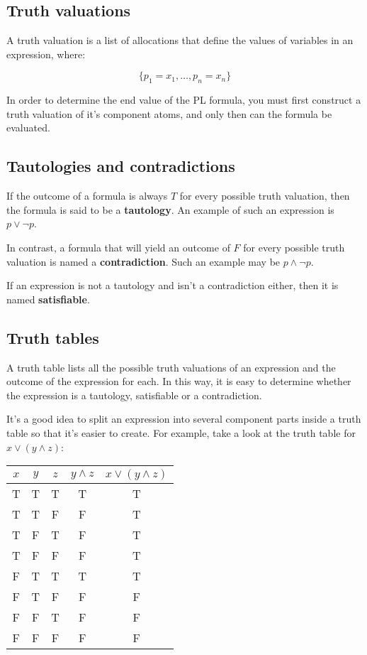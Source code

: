 \subsection{Truth valuations}

A truth valuation is a list of allocations that define the values of variables
in an expression, where:

\begin{dmath*}
	\{p_1=x_1,\dots, p_n=x_n\}
\end{dmath*}


In order to determine the end value of the PL formula, you must first construct
a truth valuation of it's component atoms, and only then can the formula be
evaluated.

\subsection{Tautologies and contradictions}

If the outcome of a formula is always $T$ for every possible truth valuation,
then the formula is said to be a {\bf tautology}. An example of such an
expression is $p \vee \neg p$.

In contrast, a formula that will yield an outcome of $F$ for every possible
truth valuation is named a {\bf contradiction}. Such an example may be $p \wedge
\neg p$.

If an expression is not a tautology and isn't a contradiction either, then it is
named {\bf satisfiable}.

\subsection{Truth tables}

A truth table lists all the possible truth valuations of an expression and the
outcome of the expression for each. In this way, it is easy to determine whether
the expression is a tautology, satisfiable or a contradiction.

It's a good idea to split an expression into several component parts inside a
truth table so that it's easier to create. For example, take a look at the truth
table for $x \vee (y \wedge z)$:

\begin{center}
	\begin{tabular}{|c c c|c|c|}
		\hline
		$x$ & $y$ & $z$ & $y \wedge z$ & $x \vee (y \wedge z)$\\ \hline
		T & T & T & T & T\\
		T & T & F & F & T\\
		T & F & T & F & T\\
		T & F & F & F & T\\
		F & T & T & T & T\\
		F & T & F & F & F\\
		F & F & T & F & F\\
		F & F & F & F & F\\ \hline
	\end{tabular}
\end{center}

